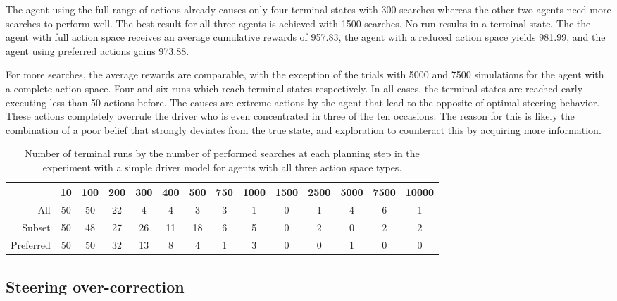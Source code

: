 The agent using the full range of actions already causes only four terminal states with 300 searches whereas the other two agents need more searches to perform well. The best result for all three agents is achieved with 1500 searches. No run results in a terminal state. The the agent with full action space receives an average cumulative rewards of 957.83, the agent with a reduced action space yields 981.99, and the agent using preferred actions gains 973.88. 

For more searches, the average rewards are comparable, with the exception of the trials with 5000 and 7500 simulations for the agent with a complete action space. Four and six runs which reach terminal states respectively. In all cases, the terminal states are reached early - executing less than 50 actions before. The causes are extreme actions by the agent that lead to the opposite of optimal steering behavior. These actions completely overrule the driver who is even concentrated in three of the ten occasions. The reason for this is likely the combination of a poor belief that strongly deviates from the true state, and exploration to counteract this by acquiring more information. %


\begin{table}[htbp]
\footnotesize
\centering
\centerfloat
\begin{tabular}{@{}rccccccccccccc@{}}
\toprule
                    & 10 & 100 & 200 & 300 & 400 & 500 & 750 & 1000 & 1500 & 2500 & 5000 & 7500 & 10000 \\ \midrule
All       & 50 & 50  & 22  & 4   & 4   & 3   & 3   & 1    & 0    & 1    & 4    & 6    & 1     \\
Subset     & 50 & 48  & 27  & 26  & 11  & 18  & 6   & 5    & 0    & 2    & 0    & 2    & 2     \\
Preferred & 50 & 50  & 32  & 13  & 8   & 4   & 1   & 3    & 0    & 0    & 1    & 0    & 0     \\ \bottomrule
\end{tabular}
\caption{Number of terminal runs by the number of performed searches at each planning step in the experiment with a simple driver model for agents with all three action space types.}
\label{tab:simple_terminal}
\end{table}


\subsection{Steering over-correction}

